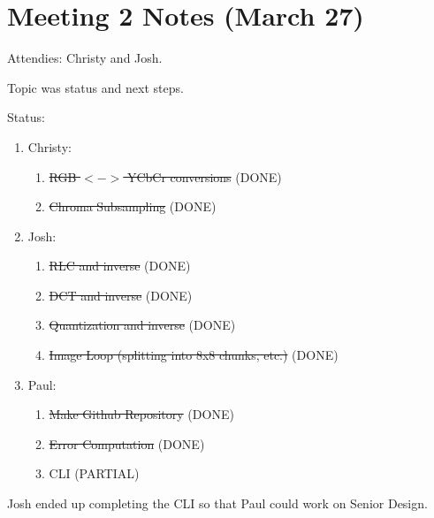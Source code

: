 \documentclass{article}
\begin{document}
\section{Meeting 2 Notes (March 27)}
\noindent
Attendies: Christy and Josh.


\noindent
Topic was status and next steps.


\noindent
Status:
\begin{enumerate}
\item Christy:
\begin{enumerate}
\item \sout{RGB $<->$ YCbCr conversions} (DONE)
\item \sout{Chroma Subsampling} (DONE)
\end{enumerate}
\item Josh:
\begin{enumerate}
\item \sout{RLC and inverse} (DONE)
\item \sout{DCT and inverse} (DONE)
\item \sout{Quantization and inverse} (DONE)
\item \sout{Image Loop (splitting into 8x8 chunks, etc.)} (DONE)
\end{enumerate}
\item Paul:
\begin{enumerate}
\item \sout{Make Github Repository} (DONE)
\item \sout{Error Computation} (DONE)
\item CLI (PARTIAL)
\end{enumerate}
\end{enumerate}

\noindent
Josh ended up completing the CLI so that Paul could work on Senior Design.
\end{document}
